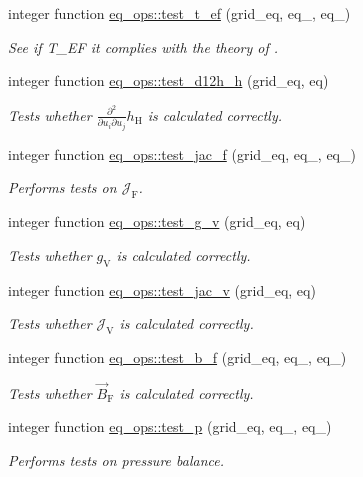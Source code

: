 \begin{DoxyCompactItemize}
integer function \hyperlink{namespaceeq__ops_a1f5049c3e309fa23ee46fd116c9344f1}{eq\+\_\+ops\+::test\+\_\+t\+\_\+ef} (grid\+\_\+eq, eq\+\_, eq\+\_)
\begin{DoxyCompactList}\small\item\em See if {\ttfamily T\+\_\+\+EF} it complies with the theory of \cite{Weyens3D}. \end{DoxyCompactList}\item 
integer function \hyperlink{namespaceeq__ops_a003df1e1ab90dc6f586c3eed3dd067e8}{eq\+\_\+ops\+::test\+\_\+d12h\+\_\+h} (grid\+\_\+eq, eq)
\begin{DoxyCompactList}\small\item\em Tests whether $ \frac{\partial^2}{\partial u_i \partial u_j} h_\text{H} $ is calculated correctly. \end{DoxyCompactList}\item 
integer function \hyperlink{namespaceeq__ops_a05dcd4803b9c7845d3353614c9630c23}{eq\+\_\+ops\+::test\+\_\+jac\+\_\+f} (grid\+\_\+eq, eq\+\_, eq\+\_)
\begin{DoxyCompactList}\small\item\em Performs tests on $ \mathcal{J}_\text{F}$. \end{DoxyCompactList}\item 
integer function \hyperlink{namespaceeq__ops_a9811c83477d9d85f7401fd7957a590fc}{eq\+\_\+ops\+::test\+\_\+g\+\_\+v} (grid\+\_\+eq, eq)
\begin{DoxyCompactList}\small\item\em Tests whether $g_\text{V}$ is calculated correctly. \end{DoxyCompactList}\item 
integer function \hyperlink{namespaceeq__ops_aef40d04e93f6a96576f8fe893fb086f8}{eq\+\_\+ops\+::test\+\_\+jac\+\_\+v} (grid\+\_\+eq, eq)
\begin{DoxyCompactList}\small\item\em Tests whether $\mathcal{J}_\text{V}$ is calculated correctly. \end{DoxyCompactList}\item 
integer function \hyperlink{namespaceeq__ops_a8082c12510696bd8ffdd0deef41860c2}{eq\+\_\+ops\+::test\+\_\+b\+\_\+f} (grid\+\_\+eq, eq\+\_, eq\+\_)
\begin{DoxyCompactList}\small\item\em Tests whether $\vec{B}_\text{F}$ is calculated correctly. \end{DoxyCompactList}\item 
integer function \hyperlink{namespaceeq__ops_a38b723f6ed5d2e2772c9c3ad14d5ffd4}{eq\+\_\+ops\+::test\+\_\+p} (grid\+\_\+eq, eq\+\_, eq\+\_)
\begin{DoxyCompactList}\small\item\em Performs tests on pressure balance. \end{DoxyCompactList}\end{DoxyCompactItemize}
